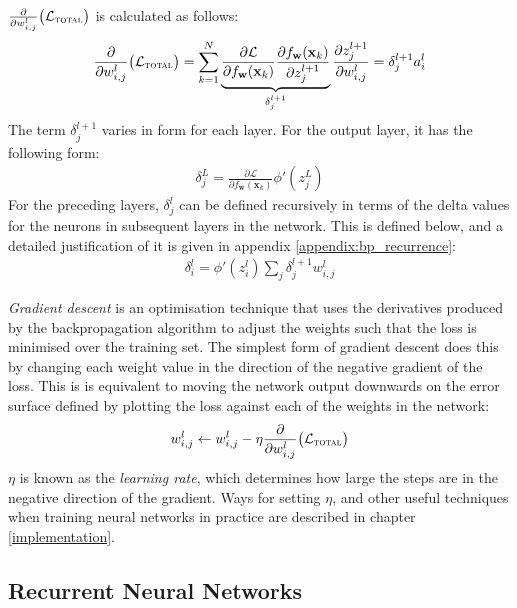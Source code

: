 \documentclass[a4paper, 12pt]{report}
\newcommand{\tit}[1]{\textit{#1}}
\begin{document}
$\frac{\partial}{\partial w_{i,j}^l} \big( \mathcal{L}_{\text{\scshape total}} \big)$ is calculated as follows:
\begin{gather} \label{eq:bp_weight_grad}
	\frac{\partial}{\partial w_{i,j}^l} \big( \mathcal{L}_{\text{\scshape total}} \big) = \sum_{k = 1}^N \underbrace{\frac{\partial \mathcal{L}}{\partial f_{\mathbf{w}}(\mathbf{x}_k)}  \frac{\partial f_{\mathbf{w}}(\mathbf{x}_k)}{\partial z_j^{l + 1}}}_{\delta_j^{l+1}}  \frac{\partial z_j^{l + 1}}{\partial w_{i,j}^l} = \delta_j^{l+1} a_i^l
\end{gather}
The term $\delta_j^{l+1}$ varies in form for each layer. For the output layer, it has the following form:
\begin{gather} \label{eq:delta_output}
	\delta_j^L = \frac{\partial \mathcal{L}}{\partial f_{\mathbf{w}}(\mathbf{x}_k)} \phi'(z_j^L)
\end{gather}
For the preceding layers, $\delta_j^l$ can be defined recursively in terms of the delta values for the neurons in subsequent layers in the network. This is defined below, and a detailed justification of it is given in appendix \ref{appendix:bp_recurrence}:
\begin{gather} \label{eq:delta_hidden}
	\delta_i^l = \phi'(z_i^l) \sum_j \delta_j^{l+1} w_{i,j}^l
\end{gather}

\tit{Gradient descent} is an optimisation technique that uses the derivatives produced by the backpropagation algorithm to adjust the weights such that the loss is minimised over the training set. The simplest form of gradient descent does this by changing each weight value in the direction of the negative gradient of the loss. This is is equivalent to moving the network output downwards on the error surface defined by plotting the loss against each of the weights in the network:
\begin{gather*}
	w_{i,j}^l \leftarrow w_{i,j}^l - \eta \frac{\partial}{\partial w_{i,j}^l} \big( \mathcal{L}_{\text{\scshape total}} \big)
\end{gather*}
$\eta$ is known as the \tit{learning rate}, which determines how large the steps are in the negative direction of the gradient. Ways for setting $\eta$, and other useful techniques when training neural networks in practice are described in chapter \ref{implementation}.

\subsection{Recurrent Neural Networks} \label{rnns}
\end{document}
